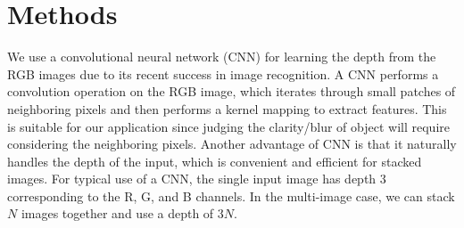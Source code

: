 \documentclass[letterpaper, 10 pt, conference]{ieeeconf}  %
\begin{document}
\section{Methods}
\label{sec:neuralNetwork}
We use a convolutional neural network (CNN) for learning the depth from the RGB images due to its recent success in image recognition. A CNN performs a convolution operation on the RGB image, which iterates through small patches of neighboring pixels and then performs a kernel mapping to extract features. This is suitable for our application since judging the clarity/blur of object will require considering the neighboring pixels. Another advantage of CNN is that it naturally handles the depth of the input, which is convenient and efficient for stacked images. For typical use of a CNN, the single input image has depth 3 corresponding to the R, G, and B channels. In the multi-image case, we can stack $N$ images together and use a depth of $3N$. 
\end{document}
